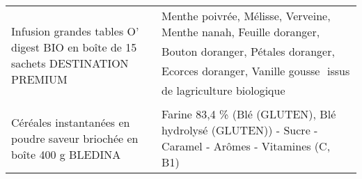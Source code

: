 \begin{longtable}{p{5cm}p{10cm}}
                         Infusion grandes tables O' digest BIO en boîte de 15 sachets DESTINATION PREMIUM &                                                                                                                                                                                                                                                                                                                                                                                                                                                                                                                                                                                                                                                                                                                                                                                                                                                           Menthe poivrée, Mélisse, Verveine, Menthe nanah, Feuille doranger, Bouton doranger, Pétales doranger, Ecorces doranger, Vanille gousse  issus de lagriculture biologique \\
                                   Céréales instantanées en poudre saveur briochée en boîte 400 g BLEDINA &                                                                                                                                                                                                                                                                                                                                                                                                                                                                                                                                                                                                                                                                                                                                                                                                                                                                                                                                      Farine 83,4 \% (Blé (GLUTEN), Blé hydrolysé (GLUTEN)) - Sucre - Caramel - Arômes - Vitamines (C, B1) \\

\end{longtable}
